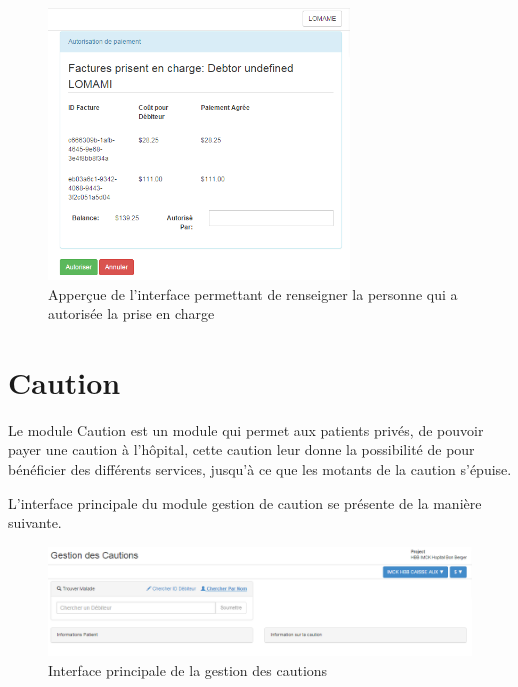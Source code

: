 \documentclass[12pt,a4paper]{report}
\begin{document}
\begin{figure}[h]
\begin{center}
\includegraphics[width=8cm]{pic/AutPrCharge.png}
\end{center}
\caption{Apperçue de l'interface permettant de renseigner la personne qui a autorisée la prise en charge}
\label{Apperçue de l'interface permettant de renseigner la personne qui a autorisée la prise en charge}
\end{figure}

\newpage
\section{Caution}
Le module Caution est un module qui permet aux patients privés, de pouvoir payer une caution à l'hôpital, cette caution leur donne la possibilité de pour bénéficier des différents services, jusqu'à ce que les motants de la caution s'épuise.

L'interface principale du module gestion de caution se présente de la manière suivante.

\begin{figure}[h]
\begin{center}
\includegraphics[width=14cm]{pic/cautionInterface.png}
\end{center}
\caption{Interface principale de la gestion des cautions}
\label{Interface principale de la gestion des cautions}
\end{figure}
\end{document}
